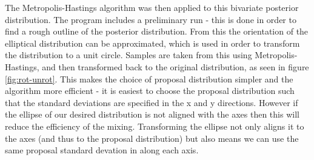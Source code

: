 \documentclass[a4paper,11pt,twoside]{article}
\begin{document}
The Metropolis-Hastings algorithm was then applied to this bivariate posterior
distribution. The program includes a preliminary run - this is done in order
to find a rough outline of the posterior distribution. From this the
orientation of the elliptical distribution can be approximated, which is used in order
to transform the distribution to a unit circle. Samples are taken from this
using Metropolis-Hastings, and then transformed back to the original
distribution, as seen in figure \ref{fig:rot-unrot}. 
This makes the choice of proposal distribution simpler and the
algorithm more efficient - it is easiest to choose the proposal distribution
such that the standard deviations are specified in the x and y directions.
However if the ellipse of our desired distribution is not aligned with the axes
then this will reduce the efficiency of the mixing. Transforming the ellipse
not only aligns it to the axes (and thus to the proposal distribution) but also
means we can use the same proposal standard devation in along each axis.
\end{document}
